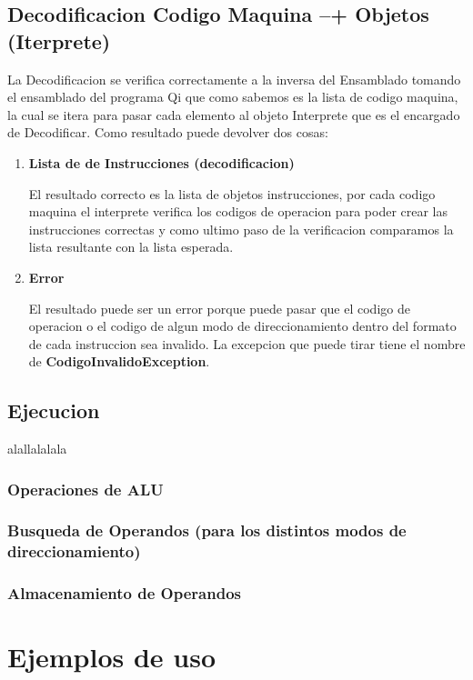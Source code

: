 \subsection{Decodificacion Codigo Maquina --+ Objetos (Iterprete)}
La Decodificacion se verifica correctamente a la inversa del Ensamblado tomando el ensamblado del programa Qi que como sabemos es la lista de codigo maquina, la cual se itera para pasar cada elemento al objeto Interprete que es el encargado de Decodificar. Como resultado puede devolver dos cosas: 
\begin{enumerate}
\item \textbf{Lista de de Instrucciones (decodificacion)} 

El resultado correcto es la lista de objetos instrucciones, por cada codigo maquina el interprete verifica los codigos de operacion para poder crear las instrucciones correctas y como ultimo paso de la verificacion comparamos la lista resultante con la lista esperada.
\item\textbf{Error}

El resultado puede ser un error porque puede pasar que el codigo de operacion o el codigo de algun modo de direccionamiento dentro del formato de cada instruccion sea invalido. La excepcion que puede tirar tiene el nombre de \textbf{CodigoInvalidoException}.   
\end{enumerate}


\subsection{Ejecucion}
alallalalala

\subsubsection{Operaciones de ALU}

\subsubsection{Busqueda de Operandos (para los distintos modos de direccionamiento)}

\subsubsection{Almacenamiento de Operandos}
\section{Ejemplos de uso}
